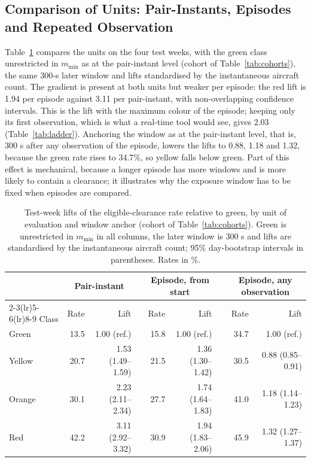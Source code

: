 \documentclass[aerospace,article,submit,moreauthors]{Definitions/mdpi}
\newcommand{\mmin}{m_{\min}}
\begin{document}
\subsection{Comparison of Units: Pair-Instants, Episodes and Repeated Observation}\label{sec:benchmarkresults}
Table~\ref{tab:units} compares the units on the four test weeks, with the green class unrestricted in $\mmin$ as at the pair-instant level (cohort of Table~\ref{tab:cohorts}), the same 300-s later window and lifts standardised by the instantaneous aircraft count. The gradient is present at both units but weaker per episode: the red lift is 1.94 per episode against 3.11 per pair-instant, with non-overlapping confidence intervals. This is the lift with the maximum colour of the episode; keeping only its first observation, which is what a real-time tool would see, gives 2.03 (Table~\ref{tab:ladder}). Anchoring the window as at the pair-instant level, that is, 300 s after any observation of the episode, lowers the lifts to 0.88, 1.18 and 1.32, because the green rate rises to 34.7\%, so yellow falls below green. Part of this effect is mechanical, because a longer episode has more windows and is more likely to contain a clearance; it illustrates why the exposure window has to be fixed when episodes are compared.

\begin{table}[t]
\caption{Test-week lifts of the eligible-clearance rate relative to green, by unit of evaluation and window anchor (cohort of Table~\ref{tab:cohorts}). Green is unrestricted in $\mmin$ in all columns, the later window is 300 s and lifts are standardised by the instantaneous aircraft count; 95\% day-bootstrap intervals in parentheses. Rates in \%.}\label{tab:units}
\small
\begin{tabular}{@{}lrrrrrrrr@{}}
\toprule
 & \multicolumn{2}{c}{Pair-instant} & & \multicolumn{2}{c}{Episode, from start} & & \multicolumn{2}{c}{Episode, any observation}\\
\cmidrule(lr){2-3}\cmidrule(lr){5-6}\cmidrule(lr){8-9}
Class & Rate & Lift & & Rate & Lift & & Rate & Lift\\
\midrule
Green & 13.5 & 1.00 (ref.) & & 15.8 & 1.00 (ref.) & & 34.7 & 1.00 (ref.)\\
Yellow & 20.7 & 1.53 (1.49--1.59) & & 21.5 & 1.36 (1.30--1.42) & & 30.5 & 0.88 (0.85--0.91)\\
Orange & 30.1 & 2.23 (2.11--2.34) & & 27.7 & 1.74 (1.64--1.83) & & 41.0 & 1.18 (1.14--1.23)\\
Red & 42.2 & 3.11 (2.92--3.32) & & 30.9 & 1.94 (1.83--2.06) & & 45.9 & 1.32 (1.27--1.37)\\
\bottomrule
\end{tabular}
\end{table}
\end{document}
